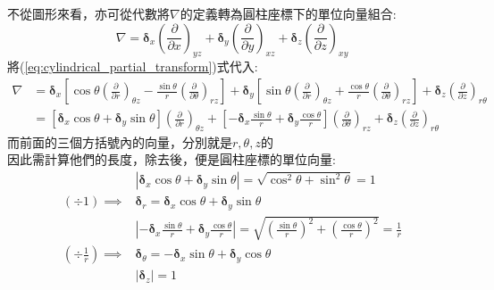 \documentclass[../main.tex]{subfiles}
\begin{document}
\begin{itemize}
\begin{itemize}
\begin{figure}[H]
      \end{figure}
      不從圖形來看，亦可從代數將$\nabla$的定義轉為圓柱座標下的單位向量組合:
      \begin{equation}
        \nabla =
        \bm\delta_x \left(\frac{\partial }{\partial x}\right)_{yz} +
        \bm\delta_y \left(\frac{\partial }{\partial y}\right)_{xz} +
        \bm\delta_z \left(\frac{\partial }{\partial z}\right)_{xy}
      \end{equation}
      將(\ref{eq:cylindrical_partial_transform})式代入:
      \begin{align}
        \nabla &=
        \bm\delta_x \left[\cos\theta \left(\frac{\partial}{\partial r}\right)_{\theta z}
        - \frac{\sin\theta}{r}\left(\frac{\partial}{\partial \theta}\right)_{rz}\right] +
        \bm\delta_y \left[\sin\theta \left(\frac{\partial}{\partial r}\right)_{\theta z}
        + \frac{\cos\theta}{r}\left(\frac{\partial}{\partial \theta}\right)_{rz}\right] +
        \bm\delta_z \left(\frac{\partial}{\partial z}\right)_{r\theta} \nonumber\\
        &=
        \left[\bm\delta_x \cos\theta + \bm\delta_y \sin\theta\right]\left(\frac{\partial}{\partial r}\right)_{\theta z} +
        \left[-\bm\delta_x \frac{\sin\theta}{r} + \bm\delta_y \frac{\cos\theta}{r}\right]\left(\frac{\partial}{\partial \theta}\right)_{rz} +
        \bm\delta_z \left(\frac{\partial}{\partial z}\right)_{r\theta}
      \end{align}
      而前面的三個方括號內的向量，分別就是$r,\theta,z$的\\
      因此需計算他們的長度，除去後，便是圓柱座標的單位向量:
      \begin{align}
        & \left| \bm\delta_x \cos\theta + \bm\delta_y \sin\theta \right| = \sqrt{\cos^2\theta + \sin^2\theta} = 1  \nonumber\\
        (\div 1)\implies & \boxed{\bm\delta_r = \bm\delta_x \cos\theta + \bm\delta_y \sin\theta} \label{eq:cylindrical_delta_r}\\
        & \left| -\bm\delta_x \frac{\sin\theta}{r} + \bm\delta_y \frac{\cos\theta}{r} \right| =
        \sqrt{\left(\frac{\sin\theta}{r}\right)^2 + \left(\frac{\cos\theta}{r}\right)^2} = \frac{1}{r} \nonumber\\
        (\div \frac{1}{r})\implies & \boxed{\bm\delta_\theta = -\bm\delta_x \sin\theta + \bm\delta_y \cos\theta} \label{eq:cylindrical_delta_theta}\\
        & \left|\bm\delta_z \right| = 1 \nonumber\\

\end{align}
\end{itemize}
\end{itemize}
\end{document}
